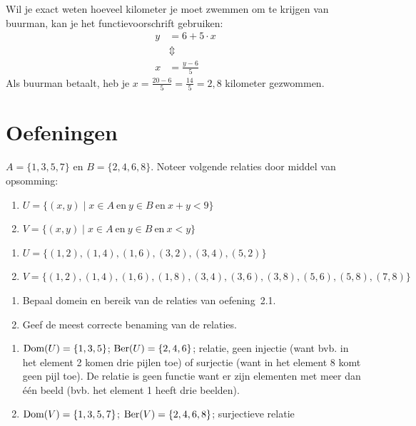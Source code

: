 Wil je exact weten hoeveel kilometer je moet zwemmen om  te krijgen van buurman, kan je het functievoorschrift gebruiken:
\[
\begin{split}
y&=6+5\cdot x\\
& \Updownarrow\\
x&=\frac{y-6}{5}
\end{split}
\]
Als buurman  betaalt, heb je $x=\frac{20-6}{5}=\frac{14}{5}=2,8$ kilometer gezwommen.







\newpage
\section{Oefeningen}
\begin{oef}
\label{oef21}
$A = \{1, 3, 5, 7\}$ en  $B = \{2, 4, 6,8\}$. Noteer volgende relaties door middel van opsomming:
\begin{enumerate}
\item $U=\{(x,y) \mid x\in A \mathrm{~en~} y \in B \mathrm{~en~} x+y<9\}$
\item $V=\{(x,y) \mid x\in A \mathrm{~en~} y \in B  \mathrm{~en~} x<y \}$
\end{enumerate}
\begin{opl}
\begin{enumerate}
\item $U=\{(1,2),(1,4),(1,6),(3,2),(3,4),(5,2) \}$
\item $V=\{(1,2),(1,4),(1,6),(1,8),(3,4),(3,6),(3,8),(5,6),(5,8),(7,8) \}$
\end{enumerate}
\end{opl}
\end{oef}

\begin{oef}
\begin{enumerate}
\item Bepaal domein en bereik van de relaties van oefening~2.1.
\item Geef de meest correcte benaming van de relaties.
\end{enumerate}
\begin{opl}
\begin{enumerate}
\item $\text{Dom}(U)=\{1,3,5 \}$; $\text{Ber}(U)=\{2,4,6 \}$; relatie, geen injectie (want bvb. in het element 2 komen drie pijlen toe) of surjectie (want in het element 8 komt geen pijl toe). De relatie is geen functie want er zijn elementen met meer dan één beeld (bvb. het element 1 heeft drie beelden).
\item $\text{Dom}(V)=\{1,3,5,7 \}$; $\text{Ber}(V)=\{2,4,6,8 \}$; surjectieve relatie
\end{enumerate}
\end{opl}
\end{oef}




